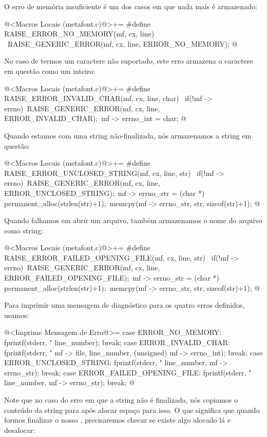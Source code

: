 O erro de memória insuficiente é um dos casos em que nada mais é
armazenado:

\iniciocodigo
@<Macros Locais (metafont.c)@>+=
#define RAISE_ERROR_NO_MEMORY(mf, cx, line) {\
  RAISE_GENERIC_ERROR(mf, cx, line, ERROR_NO_MEMORY);}
@
\fimcodigo

No caso de termos um caractere não suportado, este erro armazena o
caractere em questão como um inteiro:

\iniciocodigo
@<Macros Locais (metafont.c)@>+=
#define RAISE_ERROR_INVALID_CHAR(mf, cx, line, char) {\
  if(!mf -> errno){\
    RAISE_GENERIC_ERROR(mf, cx, line, ERROR_INVALID_CHAR);\
    mf -> errno_int = char;}}
@
\fimcodigo

Quando estamos com uma string não-finalizada, nós armazenamos a string
em questão:

\iniciocodigo
@<Macros Locais (metafont.c)@>+=
#define RAISE_ERROR_UNCLOSED_STRING(mf, cx, line, str) {\
  if(!mf -> errno){\
    RAISE_GENERIC_ERROR(mf, cx, line, ERROR_UNCLOSED_STRING);\
    mf -> errno_str = (char *) permanent_alloc(strlen(str)+1);\
    memcpy(mf -> errno_str, str, sizeof(str)+1);}}
@
\fimcodigo

Quando falhamos em abrir um arquivo, também armazenamos o nome do
arquivo como string:

\iniciocodigo
@<Macros Locais (metafont.c)@>+=
#define RAISE_ERROR_FAILED_OPENING_FILE(mf, cx, line, str) {\
  if(!mf -> errno){\
    RAISE_GENERIC_ERROR(mf, cx, line, ERROR_FAILED_OPENING_FILE);\
    mf -> errno_str = (char *) permanent_alloc(strlen(str)+1);\
    memcpy(mf -> errno_str, str, sizeof(str)+1);}}
@
\fimcodigo

Para imprimir uma mensagem de diagnóstico para os quatro erros
definidos, usamos:

\iniciocodigo
@<Imprime Mensagem de Erro@>=
case ERROR_NO_MEMORY:
  fprintf(stderr, "%
          line_number);
  break;
case ERROR_INVALID_CHAR:
  fprintf(stderr, "%
          mf -> file, line_number, (unsigned) mf -> errno_int);
  break;
case ERROR_UNCLOSED_STRING:
  fprintf(stderr, "%
          line_number, mf -> errno_str);
  break;
case ERROR_FAILED_OPENING_FILE:
  fprintf(stderr, "%
          line_number, mf -> errno_str);
  break;  
@
\fimcodigo

Note que no caso do erro em que a string não é finalizada, nós
copiamos o conteúdo da string para  após alocar
espaço para isso. O que significa que quando formos finalizar o
nosso \monoespaco{struct metafont}, precisaremos checar se existe algo
alocado lá e desalocar:

